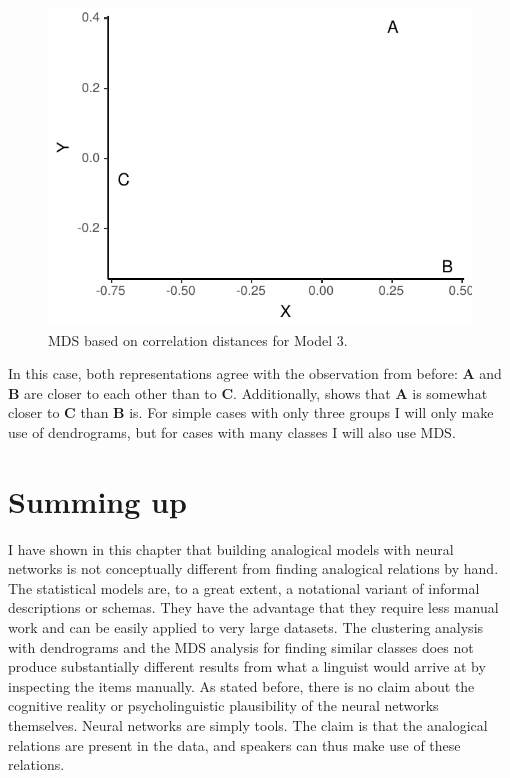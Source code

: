 \begin{figure}[!htpb]
  \centering
  \includegraphics{./figures/fake/mds3.pdf}
  \caption{MDS based on correlation distances for Model 3.}\label{fig:mds-model3}
\end{figure}

In this case, both representations agree with the observation from before: \textbf{A} and \textbf{B} are closer to each other than to \textbf{C}. Additionally,  shows that \textbf{A} is somewhat closer to \textbf{C} than \textbf{B} is. For simple cases with only three groups I will only make use of dendrograms, but for cases with many classes I will also use MDS.

\section{Summing up}

I have shown in this chapter that building analogical models with neural networks is not conceptually different from finding analogical relations by hand. The statistical models are, to a great extent, a notational variant of informal descriptions or schemas. They have the advantage that they require less manual work and can be easily applied to very large datasets. The clustering analysis with dendrograms and the MDS analysis for finding similar classes does not produce substantially different results from what a linguist would arrive at by inspecting the items manually. As stated before, there is no claim about the cognitive reality or psycholinguistic plausibility of the neural networks themselves. Neural networks are simply tools. The claim is that the analogical relations are present in the data, and speakers can thus make use of these relations.

